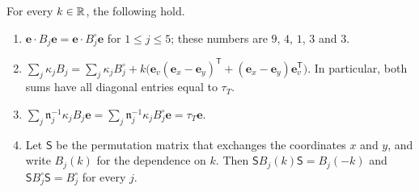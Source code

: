 \begin{lemma}\label{lem:cub-identities}
For every $k\in\mathbb R$, the following hold.
\begin{enumerate}[label=\textup{(\alph*)}]
\item $\mathbf e\cdot B_j\mathbf e=\mathbf e\cdot B_j^\circ\mathbf e$ for
 $1\le j\le5$; these numbers are $9$, $4$, $1$, $3$ and $3$.
\item $\sum_j\kappa_jB_j=\sum_j\kappa_jB_j^\circ
 +k\bigl(\mathbf e_v(\mathbf e_x-\mathbf e_y)^{\mathsf T}
 +(\mathbf e_x-\mathbf e_y)\mathbf e_v^{\mathsf T}\bigr)$. In particular, both
 sums have all diagonal entries equal to $\tau_T$.
\item $\sum_j\mathfrak n_j^{-1}\kappa_jB_j\mathbf e
 =\sum_j\mathfrak n_j^{-1}\kappa_jB_j^\circ\mathbf e=\tau_T\mathbf e$.
\item Let $\mathsf S$ be the permutation matrix that exchanges the coordinates
 $x$ and $y$, and write $B_j(k)$ for the dependence on $k$. Then
 $\mathsf SB_j(k)\mathsf S=B_j(-k)$ and $\mathsf SB_j^\circ\mathsf S=B_j^\circ$ for
 every $j$.
\end{enumerate}
\end{lemma}

